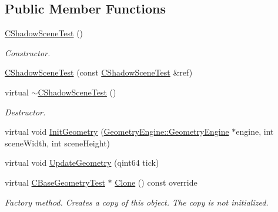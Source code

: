 \subsection*{Public Member Functions}
\begin{DoxyCompactItemize}
\item 
\mbox{\label{class_unit_test_1_1_c_shadow_scene_test_a20100a45d4622c2a49020efcbb3b6126}} 
\mbox{\hyperlink{class_unit_test_1_1_c_shadow_scene_test_a20100a45d4622c2a49020efcbb3b6126}{C\+Shadow\+Scene\+Test}} ()
\begin{DoxyCompactList}\small\item\em Constructor. \end{DoxyCompactList}\item 
\mbox{\hyperlink{class_unit_test_1_1_c_shadow_scene_test_a3bf2724745aa4037cc80a8d3b770bb07}{C\+Shadow\+Scene\+Test}} (const \mbox{\hyperlink{class_unit_test_1_1_c_shadow_scene_test}{C\+Shadow\+Scene\+Test}} \&ref)
\item 
\mbox{\label{class_unit_test_1_1_c_shadow_scene_test_aa036509c39f4030cc5b9097bc1967e1f}} 
virtual \mbox{\hyperlink{class_unit_test_1_1_c_shadow_scene_test_aa036509c39f4030cc5b9097bc1967e1f}{$\sim$\+C\+Shadow\+Scene\+Test}} ()
\begin{DoxyCompactList}\small\item\em Destructor. \end{DoxyCompactList}\item 
virtual void \mbox{\hyperlink{class_unit_test_1_1_c_shadow_scene_test_a39155841ac304757b41950c00cf712c7}{Init\+Geometry}} (\mbox{\hyperlink{class_geometry_engine_1_1_geometry_engine}{Geometry\+Engine\+::\+Geometry\+Engine}} $\ast$engine, int scene\+Width, int scene\+Height)
\item 
virtual void \mbox{\hyperlink{class_unit_test_1_1_c_shadow_scene_test_a5586404efaf70bc59cefd4616fe7f761}{Update\+Geometry}} (qint64 tick)
\item 
\mbox{\label{class_unit_test_1_1_c_shadow_scene_test_a1eb57a17b2c4779ca7664c15bde9549f}} 
virtual \mbox{\hyperlink{class_unit_test_1_1_c_base_geometry_test}{C\+Base\+Geometry\+Test}} $\ast$ \mbox{\hyperlink{class_unit_test_1_1_c_shadow_scene_test_a1eb57a17b2c4779ca7664c15bde9549f}{Clone}} () const override
\begin{DoxyCompactList}\small\item\em Factory method. Creates a copy of this object. The copy is not initialized. \end{DoxyCompactList}\end{DoxyCompactItemize}
